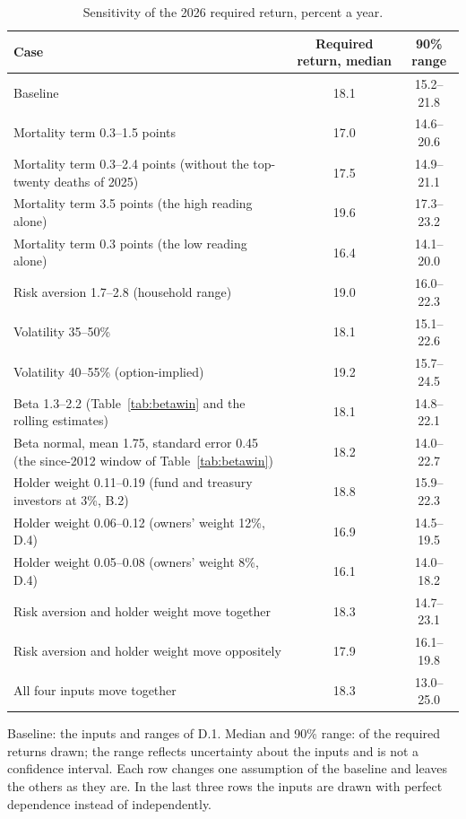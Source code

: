 \documentclass[11pt]{article}
\begin{document}
\begin{table}[ht]\centering\small
\caption{Sensitivity of the 2026 required return, percent a year.}
\label{tab:sens}
\begin{tabular}{lcc}
\toprule
Case & Required return, median & 90\% range \\
\midrule
Baseline & 18.1 & 15.2--21.8 \\
\addlinespace
Mortality term 0.3--1.5 points & 17.0 & 14.6--20.6 \\
Mortality term 0.3--2.4 points (without the top-twenty deaths of 2025) & 17.5 & 14.9--21.1 \\
Mortality term 3.5 points (the high reading alone) & 19.6 & 17.3--23.2 \\
Mortality term 0.3 points (the low reading alone) & 16.4 & 14.1--20.0 \\
Risk aversion 1.7--2.8 (household range) & 19.0 & 16.0--22.3 \\
Volatility 35--50\% & 18.1 & 15.1--22.6 \\
Volatility 40--55\% (option-implied) & 19.2 & 15.7--24.5 \\
Beta 1.3--2.2 (Table~\ref{tab:betawin} and the rolling estimates) & 18.1 & 14.8--22.1 \\
Beta normal, mean 1.75, standard error 0.45 (the since-2012 window of Table~\ref{tab:betawin}) & 18.2 & 14.0--22.7 \\
\addlinespace
Holder weight 0.11--0.19 (fund and treasury investors at 3\%, B.2) & 18.8 & 15.9--22.3 \\
Holder weight 0.06--0.12 (owners' weight 12\%, D.4) & 16.9 & 14.5--19.5 \\
Holder weight 0.05--0.08 (owners' weight 8\%, D.4) & 16.1 & 14.0--18.2 \\
\addlinespace
Risk aversion and holder weight move together & 18.3 & 14.7--23.1 \\
Risk aversion and holder weight move oppositely & 17.9 & 16.1--19.8 \\
All four inputs move together & 18.3 & 13.0--25.0 \\
\bottomrule
\end{tabular}
\par\smallskip\parbox{0.8\textwidth}{\footnotesize Baseline: the inputs and ranges of D.1. Median and 90\% range: of the required returns drawn; the range reflects uncertainty about the inputs and is not a confidence interval. Each row changes one assumption of the baseline and leaves the others as they are. In the last three rows the inputs are drawn with perfect dependence instead of independently.}
\end{table}
\end{document}
